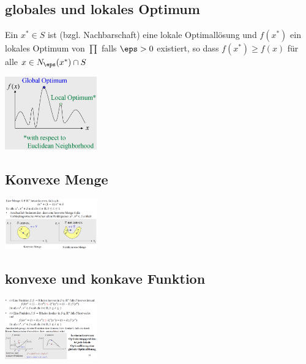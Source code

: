 \documentclass{report}
\newenvironment{Figure}
	{\par\medskip\noindent\minipage{\linewidth}}
	{\endminipage\par\medskip}
\theoremstyle{definition}
\theoremstyle{example}
\begin{document}
   \subsection{globales und lokales Optimum}
Ein $x^* \in S$ ist (bzgl. Nachbarschaft) eine lokale Optimallösung und $f(x^*)$ ein lokales Optimum von $\prod$ falls $\eps > 0$ existiert, so dass $f(x^*) \geq f(x)$ für alle $x \in N_\eps (x^*) \cap S$
\begin{Figure}
\centering
\includegraphics[width=150px]{img/GlobLocOpt.png}
	\label{fig:Funktion globales bzw lokales Optimum}
\end{Figure}

   \subsection{Konvexe Menge}
\begin{Figure}
\centering
\includegraphics[width=150px]{img/KonvexeMenge.png}
	\label{fig:Konvexe Menge}
\end{Figure}

   \subsection{konvexe und konkave Funktion}
\begin{Figure}
\centering
\includegraphics[width=150px]{img/konvexKonkav.png}
	\label{fig:konvexe vs konkave Funktion}
\end{Figure}
\end{document}
